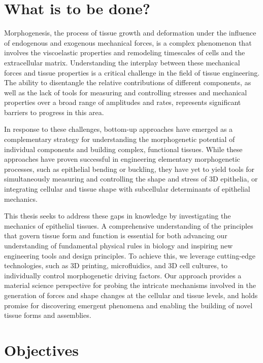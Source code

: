 \hypertarget{what-is-to-be-done}{%
\section{What is to be done?}\label{what-is-to-be-done}}

Morphogenesis, the process of tissue growth and deformation under the influence of endogenous and exogenous mechanical forces, is a complex phenomenon that involves the viscoelastic properties and remodeling timescales of cells and the extracellular matrix. Understanding the interplay between these mechanical forces and tissue properties is a critical challenge in the field of tissue engineering. The ability to disentangle the relative contributions of different components, as well as the lack of tools for measuring and controlling stresses and mechanical properties over a broad range of amplitudes and rates, represents significant barriers to progress in this area.  

In response to these challenges, bottom-up approaches have emerged as a complementary strategy for understanding the morphogenetic potential of individual components and building complex, functional tissues. While these approaches have proven successful in engineering elementary morphogenetic processes, such as epithelial bending or buckling, they have yet to yield tools for simultaneously measuring and controlling the shape and stress of 3D epithelia, or integrating cellular and tissue shape with subcellular determinants of epithelial mechanics.  

This thesis seeks to address these gaps in knowledge by investigating the mechanics of epithelial tissues. A comprehensive understanding of the principles that govern tissue form and function is essential for both advancing our understanding of fundamental physical rules in biology and inspiring new engineering tools and design principles. To achieve this, we leverage cutting-edge technologies, such as 3D printing, microfluidics, and 3D cell cultures, to individually control morphogenetic driving factors. Our approach provides a material science perspective for probing the intricate mechanisms involved in the generation of forces and shape changes at the cellular and tissue levels, and holds promise for discovering emergent phenomena and enabling the building of novel tissue forms and assemblies.  

\hypertarget{objectives}{%
\section{Objectives}\label{objectives}}

